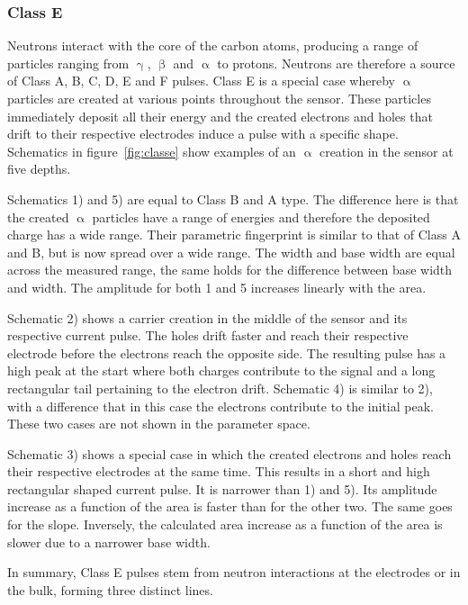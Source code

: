 \clearpage
\subsubsection{Class E}
\label{sec:classe}
Neutrons interact with the core of the carbon atoms, producing a range of particles ranging from $\upgamma$, $\upbeta$ and $\upalpha$ to protons. Neutrons are therefore a source of Class A, B, C, D, E and F pulses. Class E is a special case whereby $\upalpha$ particles are created at various points throughout the sensor. These particles immediately deposit all their energy and the created electrons and holes that drift to their respective electrodes induce a pulse with a specific shape. Schematics in figure~\ref{fig:classe} show examples of an $\upalpha$ creation in the sensor at five depths. 

Schematics 1) and 5) are equal to Class B and A type. The difference here is that the created $\upalpha$ particles have a range of energies and therefore the deposited charge has a wide range. Their parametric fingerprint is similar to that of Class A and B, but is now spread over a wide range. The width and base width are equal across the measured range, the same holds for the difference between base width and width. The amplitude for both 1 and 5 increases linearly with the area.

Schematic 2) shows a carrier creation in the middle of the sensor and its respective current pulse. The holes drift faster and reach their respective electrode before the electrons reach the opposite side. The resulting pulse has a high peak at the start where both charges contribute to the signal and a long rectangular tail pertaining to the electron drift. Schematic 4) is similar to 2), with a difference that in this case the electrons contribute to the initial peak. These two cases are not shown in the parameter space.

Schematic 3) shows a special case in which the created electrons and holes reach their respective electrodes at the same time. This results in a short and high rectangular shaped current pulse. It is narrower than 1) and 5). Its amplitude increase as a function of the area is faster than for the other two. The same goes for the slope. Inversely, the calculated area increase as a function of the area is slower due to a narrower base width. 

In summary, Class E pulses stem from neutron interactions at the electrodes or in the bulk, forming three distinct lines.





